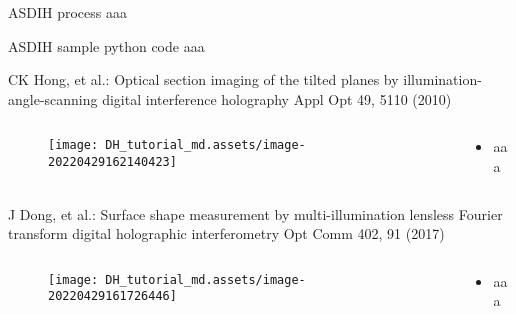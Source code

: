 \documentclass[t, aspectratio=169]{beamer}
\begin{document}
\begin{frame}{ASDIH process}
aaa
\end{frame}


\begin{frame}{ASDIH sample python code}
aaa
\end{frame}


\begin{frame}{CK Hong, et al.: Optical section imaging of the tilted planes by illumination-angle-scanning digital interference holography}
	\vspace{-3 mm}
	\small Appl Opt 49, 5110 (2010)
	\begin{columns}
		\begin{column}{.6\textwidth}
			\begin{figure}
				\texttt{[image: DH\_tutorial\_md.assets/image-20220429162140423]}
			\end{figure}
		\end{column}
		\begin{column}{.4\textwidth}
			\begin{itemize}
				\item aaa
			\end{itemize}
		\end{column}
	\end{columns}
\end{frame}

 
\begin{frame}{J Dong, et al.: Surface shape measurement by multi-illumination lensless Fourier transform digital holographic interferometry}
	\vspace{-3 mm}
	\small Opt Comm 402, 91 (2017)
	\begin{columns}
		\begin{column}{.6\textwidth}
			\begin{figure}
				\texttt{[image: DH\_tutorial\_md.assets/image-20220429161726446]}
			\end{figure}
		\end{column}
		\begin{column}{.4\textwidth}
			\begin{itemize}
				\item aaa
			\end{itemize}
		\end{column}
	\end{columns}
\end{frame}
\end{document}

